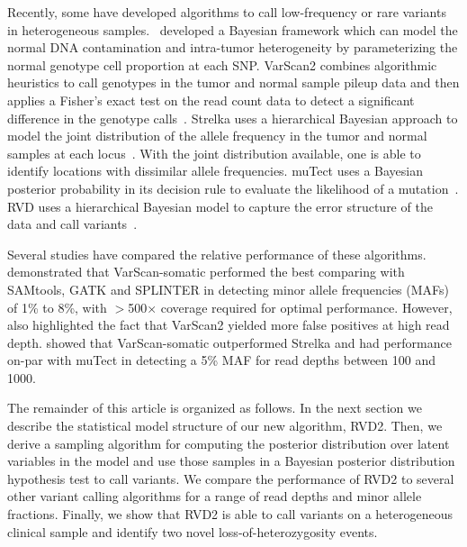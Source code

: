 \documentclass{bioinfo}
\begin{document}
Recently, some have developed algorithms to call low-frequency or rare variants in heterogeneous samples.~\citet{yau2010statistical} developed a Bayesian framework which can model the normal DNA contamination and intra-tumor heterogeneity by parameterizing the normal genotype cell proportion at each SNP. VarScan2 combines algorithmic heuristics to call genotypes in the tumor and normal sample pileup data and then applies a Fisher's exact test on the read count data to detect a significant difference in the genotype calls~\citep{Koboldt:2012cg}. Strelka uses a hierarchical Bayesian approach to model the joint distribution of the allele frequency in the tumor and normal samples at each locus~\citep{Saunders:2012fh}. With the joint distribution available, one is able to identify locations with dissimilar allele frequencies. muTect uses a Bayesian posterior probability in its decision rule to evaluate the likelihood of a mutation~\citep{Cibulskis:2013ta}. RVD uses a hierarchical Bayesian model to capture the error structure of the data and call variants~\citep{Flaherty:2011ja, cushing2013rvd}.

Several studies have compared the relative performance of these algorithms. \citet{spencer2013performance} demonstrated  that VarScan-somatic performed the best comparing with SAMtools, GATK and SPLINTER in detecting minor allele frequencies (MAFs) of 1\% to 8\%, with $ > $500× coverage required for optimal performance. However, \citet{spencer2013performance} also highlighted the fact that VarScan2 yielded more false positives at high read depth. \citet{Stead:2013fu} showed that VarScan-somatic outperformed Strelka and had performance on-par with muTect in detecting a 5\% MAF for read depths between 100 and 1000. %

The remainder of this article is organized as follows. In the next section we describe the statistical model structure of our new algorithm, RVD2. Then, we derive a sampling algorithm for computing the posterior distribution over latent variables in the model and use those samples in a Bayesian posterior distribution hypothesis test to call variants. We compare the performance of RVD2 to several other variant calling algorithms for a range of read depths and minor allele fractions. Finally, we show that RVD2 is able to call variants on a heterogeneous clinical sample and identify two novel loss-of-heterozygosity events.

\end{document}
